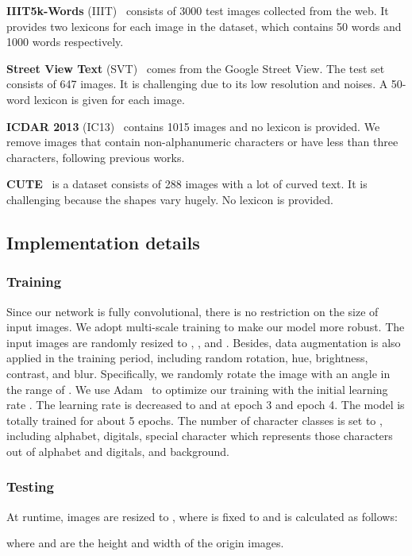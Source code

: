 \documentclass[letterpaper]{article} \usepackage{aaai19}  \usepackage{times}  \usepackage{helvet}  \usepackage{courier}  \usepackage{url}  \usepackage{graphicx}  \frenchspacing  \usepackage{multirow}
\begin{document}
\textbf{IIIT5k-Words} (IIIT)~\cite{DBLP:conf/cvpr/MishraAJ12} consists of 3000 test images collected from the web. It provides two lexicons for each image in the dataset, which contains 50 words and 1000 words respectively.

\textbf{Street View Text} (SVT)~\cite{DBLP:conf/iccv/WangBB11} comes from the Google Street View. The test set consists of 647 images. It is challenging due to its low resolution and noises. A 50-word lexicon is given for each image.

\textbf{ICDAR 2013} (IC13)~\cite{karatzas2013icdar} contains 1015 images and no lexicon is provided. We remove images that contain non-alphanumeric characters or have less than three characters, following previous works.

\textbf{CUTE}~\cite{cute} is a dataset consists of 288 images with a lot of curved text. It is challenging because the shapes vary hugely. No lexicon is provided.

\subsection{Implementation details}
\subsubsection{Training}
Since our network is fully convolutional, there is no restriction on the size of input images. We adopt multi-scale training to make our model more robust. The input images are randomly resized to , , and . Besides, data augmentation is also applied in the training period, including random rotation, hue, brightness, contrast, and blur. Specifically, we randomly rotate the image with an angle in the range of .
We use Adam~\cite{adam} to optimize our training with the initial learning rate . The learning rate is decreased to  and  at epoch 3 and epoch 4. The model is totally trained for about 5 epochs. The number of character classes is set to , including  alphabet,  digitals,  special character which represents those characters out of alphabet and digitals, and  background. 

\subsubsection{Testing}
At runtime, images are resized to , where  is fixed to  and  is calculated as follows:

where  and  are the height and width of the origin images. 
\end{document}
